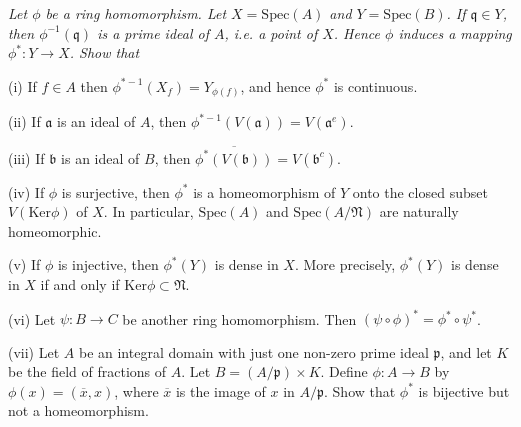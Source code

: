 \begin{problem}\em
Let $\phi$ be a ring homomorphism. Let $X=\mathrm{Spec}(A)$ and $Y=\mathrm{Spec}(B)$. If $\mathfrak{q}\in Y$, then $\phi^{-1}(\mathfrak{q})$ is a prime ideal of $A$, i.e. a point of $X$. Hence $\phi$ induces a mapping $\phi^*:Y\to X$. Show that \par
(i) If $f\in A$ then $\phi^{*-1}(X_f)=Y_{\phi(f)}$, and hence $\phi^*$ is continuous.\par
(ii) If $\mathfrak{a}$ is an ideal of $A$, then $\phi^{*-1}(V(\mathfrak{a}))=V(\mathfrak{a}^e)$.\par
(iii) If $\mathfrak{b}$ is an ideal of $B$, then $\overline{\phi^*(V(\mathfrak{b}))}=V(\mathfrak{b}^c)$.\par
(iv) If $\phi$ is surjective, then $\phi^*$ is a homeomorphism of $Y$ onto the closed subset $V(\mathrm{Ker}\phi)$ of $X$. In particular, $\mathrm{Spec}(A)$ and $\mathrm{Spec}(A/\mathfrak{N})$ are naturally homeomorphic.\par
(v) If $\phi$ is injective, then $\phi^*(Y)$ is dense in $X$. More precisely, $\phi^*(Y)$ is dense in $X$ if and only if $\mathrm{Ker}\phi\subset\mathfrak{N}$.\par
(vi) Let $\psi:B\to C$ be another ring homomorphism. Then $(\psi\circ\phi)^*=\phi^*\circ\psi^*$.\par
(vii) Let $A$ be an integral domain with just one non-zero prime ideal $\mathfrak{p}$, and let $K$ be the field of fractions of $A$. Let $B=(A/\mathfrak{p})\times K$. Define $\phi:A\to B$ by $\phi(x)=(\overline{x},x)$, where $\overline{x}$ is the image of $x$ in $A/\mathfrak{p}$. Show that $\phi^*$ is bijective but not a homeomorphism.
\end{problem}
